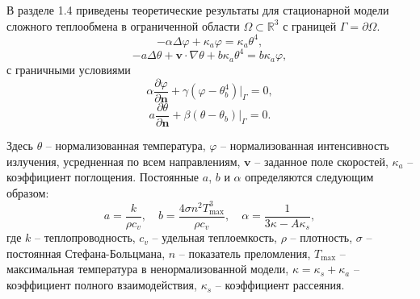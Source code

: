 В разделе 1.4 приведены теоретические результаты для
стационарной модели сложного теплообмена
в ограниченной области $\Omega \subset \mathbb{R}^3$ с границей $\Gamma=\partial \Omega$.
\begin{equation}
    \label{eq:1_4:4-2}
    - \alpha \Delta \varphi + \kappa_a \varphi = \kappa_a \theta^4,
\end{equation}
\begin{equation}
    \label{eq:1_4:4-1}
    -a \Delta \theta + \textbf{v} \cdot \nabla \theta
    + b \kappa_a \theta^4 =  b \kappa_a \varphi,
\end{equation}
с граничными условиями
\begin{equation}
    \label{eq:1_4:4-4}
    \alpha \frac{\partial \varphi}{\partial \mathbf{n}} + \gamma
    (\varphi-\theta_b^4)|_{\Gamma} = 0,
\end{equation}
\begin{equation}
    \label{eq:1_4:4-3}
    a \frac{\partial \theta}{\partial \mathbf{n}}
    +\left.\beta\left(\theta-\theta_{b}\right)\right|_{\Gamma}=0.
\end{equation}


Здесь $\theta$ -- нормализованная температура, $\varphi$ --
нормализованная интенсивность излучения, усредненная по всем
направлениям, $\textbf{v}$ -- заданное поле скоростей, $\kappa_a$ --
коэффициент поглощения.
Постоянные $a$, $b$ и $\alpha$
определяются следующим образом:
\[
    a=\frac{k}{\rho c_v},\quad b = \frac{4\sigma n^2 T_{\max}^3}{\rho c_v},
    \quad \alpha=\frac{1}{3\kappa - A \kappa_s},
\]
где $k$ -- теплопроводность, $c_v$ -- удельная теплоемкость, $\rho$ --
плотность, $\sigma$ -- постоянная Стефана-Больцмана, $n$ --
показатель преломления, $T_{\max}$ -- максимальная температура в
ненормализованной модели, $\kappa = \kappa_s + \kappa_a$ -- коэффициент
полного взаимодействия, $\kappa_s$ -- коэффициент рассеяния.

